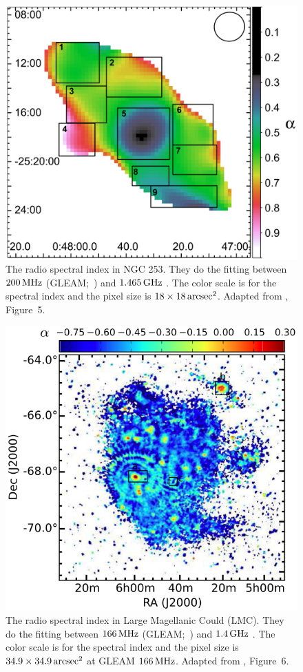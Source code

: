 \begin{figure}[htbp]
	\centering
	\includegraphics[width=.6\linewidth]{Chapter_1/Figures/Kapinska2017_Figure5.png}
    \caption[The spectral index map in NGC 253]{\label{fig:Kapinska2017_Figure5}
        The radio spectral index in NGC 253.
        They do the fitting between $200\,\mathrm{MHz}$ (GLEAM;~\citealt{Hurley-Walker2017a}) and $1.465\,\mathrm{GHz}$ \citep{Carilli1992}.
        The color scale is for the spectral index and the pixel size is $18 \times 18 \,\mathrm{arcsec}^2$.
        Adapted from \citealt{Kapinska2017a}, Figure~5.
    }
\end{figure}

\begin{figure}[htbp]
	\centering
	\includegraphics[width=.6\linewidth]{Chapter_1/Figures/For2018_Figure6.png}
    \caption[The spectral index map in Large Magellanic Cloud]{\label{fig:For2018_Figure6}
        The radio spectral index in Large Magellanic Could (LMC).
        They do the fitting between $166\,\mathrm{MHz}$ (GLEAM;~\citealt{Hurley-Walker2017a}) and $1.4\,\mathrm{GHz}$ \citep{Hughes2007}.
        The color scale is for the spectral index and the pixel size is $34.9 \times 34.9 \,\mathrm{arcsec}^2$ at GLEAM $166\,\mathrm{MHz}$.
        Adapted from \citealt{For2018a}, Figure~6.
    }
\end{figure}

